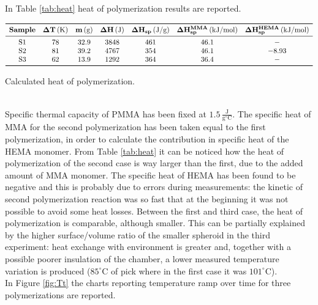 \documentclass[a4paper, 11pt]{article}
\begin{document}
In Table \ref{tab:heat} heat of polymerization results are reported. 
\begin{table}[htp]
\centering
$
\begin{array}{ccccccc}
\toprule
\textbf{Sample} & \mathbf{\Delta T}\,(\text{K}) &  \mathbf{m}\,(\text{g}) & \mathbf{\Delta H}\,(\text{J}) & \mathbf{\Delta H_{sp}}\,(\text{J}/\text{g}) & \mathbf{\Delta H_{sp}^{MMA}}\,(\text{kJ}/\text{mol}) & \mathbf{\Delta H_{sp}^{HEMA}}\,(\text{kJ}/\text{mol}) \\
\midrule
\text{S1} & 78 & 32.9 & 3848 & 461 & 46.1 & -\\
\text{S2} & 81 & 39.2 & 4767 & 354 & 46.1 & - 8.93 \\
\text{S3} & 62 & 13.9 & 1292 & 364 & 36.4 & - \\
\bottomrule
\end{array}
$
\caption{Calculated heat of polymerization.}
\label{tab:heat}
\end{table}\\
Specific thermal capacity of PMMA has been fixed at $1.5 \,\frac{\text{J}}{\text{g}^\circ\text{C}}$.
The specific heat of MMA for the second polymerization has been taken equal to the first polymerization, in order to calculate the contribution in specific heat of the HEMA monomer. From Table \ref{tab:heat} it can be noticed how the heat of polymerization of the second case is way larger than the first, due to the added amount of MMA monomer. The specific heat of HEMA has been found to be negative and this is probably due to errors during measurements: the kinetic of second polymerization reaction was so fast that at the beginning it was not possible to avoid some heat losses. Between the first and third case, the heat of polymerization is comparable, although smaller. This can be partially explained by the higher surface/volume ratio of the smaller spheroid in the third experiment: heat exchange with environment is greater and, together with a possible poorer insulation of the chamber, a lower measured temperature variation is produced ($85^\circ$C of pick where in the first case it was $101^\circ$C). \\
In Figure \ref{fig:Tt} the charts reporting temperature ramp over time for three polymerizations are reported. 
\end{document}
